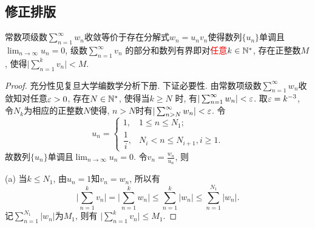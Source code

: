 \documentclass[a4paper,12pt,twoside]{ctexart}
\begin{document}
\subsection{修正排版}
    \begin{theo}\label{theo}
    常数项级数$\sum_{n=1}^{\infty}{w_n}$收敛等价于存在分解式$w_n={u_n}{v_n}$使得数列$\{u_n\}$单调且$\lim_{n\to{\infty}}u_n=0$, 级数$\sum_{n=1}^{\infty}{v_n}$ 的部分和数列有界即对\textcolor{red}{任意}$k\in{\mathbb N}^*$, 存在正整数$M$, 使得$\vert\sum_{n=1}^{k}{v_n}\vert<M$.
    \end{theo}
    \begin{proof}
        充分性见复旦大学编数学分析下册. 下证必要性. 由常数项级数$\sum_{n=1}^{\infty}{w_n}$收敛知对任意$\varepsilon>0$, 存在$N\in{\mathbb N}^*$, 使得当$k\ge N$ 时, 有$\vert\sum_{n=1}^{\infty}w_n\vert<\varepsilon$. 取$\varepsilon=k^{-3}$, 令$N_k$为相应的正整数$N$使得, $n>N$时有$\vert\sum_{n>N}^\infty w_n\vert<\varepsilon$. 令
        $$u_n=\begin{cases}
            1,&1\le n\le N_1;\\
            \dfrac1i,&N_i<n\le N_{i+1}, i\ge1.
        \end{cases}$$
        故数列$\{u_n\}$单调且$\lim_{n\to{\infty}}u_n=0$. 令$v_n=\frac{w_n}{u_n}$, 则

        (a) 当$k\le N_1$, 由$u_n=1$知$v_n=w_n$, 所以有$$\vert\sum_{n=1}^{k}{v_n}\vert=\vert\sum_{n=1}^{k}{w_n}\vert \le\sum\limits_{n=1}^{k}{\vert{w_n}\vert}\le\sum_{n=1}^{N_1}\vert w_n\vert.$$ 记$\sum_{n=1}^{N_1}\vert w_n\vert$为$M_1$, 则有 $\vert\sum_{n=1}^kv_n\vert\le M_1$.


\end{proof}
\end{document}
